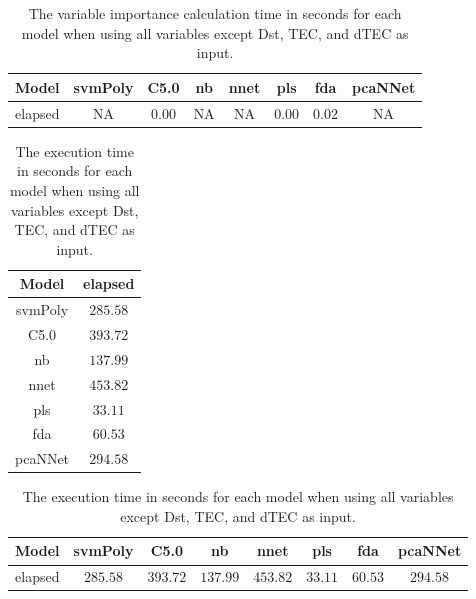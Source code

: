 \begin{table}[!ht]
	\centering
	\begin{tabular}{|c|c|c|c|c|c|c|c|}
		\hline
		Model & svmPoly & C5.0 & nb & nnet & pls & fda & pcaNNet \\ \hline
		elapsed & NA & $0.00$ & NA & NA & $0.00$ & $0.02$ & NA \\ \hline
	\end{tabular}
	\caption{The variable importance calculation time in seconds for each model when using all variables except Dst, TEC, and dTEC as input.}
	\label{tab:time:reverse:noTEC:importance}
\end{table}

\begin{table}[!ht]
	\centering
	\begin{tabular}{|c|c|}
		\hline
		Model & elapsed \\ \hline
		svmPoly & $285.58$ \\ \hline
		C5.0 & $393.72$ \\ \hline
		nb & $137.99$ \\ \hline
		nnet & $453.82$ \\ \hline
		pls & $33.11$ \\ \hline
		fda & $60.53$ \\ \hline
		pcaNNet & $294.58$ \\ \hline
	\end{tabular}
	\caption{The execution time in seconds for each model when using all variables except Dst, TEC, and dTEC as input.}
	\label{tab:time:noTEC:total}
\end{table}

\begin{table}[!ht]
	\centering
	\begin{tabular}{|c|c|c|c|c|c|c|c|}
		\hline
		Model & svmPoly & C5.0 & nb & nnet & pls & fda & pcaNNet \\ \hline
		elapsed & $285.58$ & $393.72$ & $137.99$ & $453.82$ & $33.11$ & $60.53$ & $294.58$ \\ \hline
	\end{tabular}
	\caption{The execution time in seconds for each model when using all variables except Dst, TEC, and dTEC as input.}
	\label{tab:time:reverse:noTEC:total}
\end{table}

